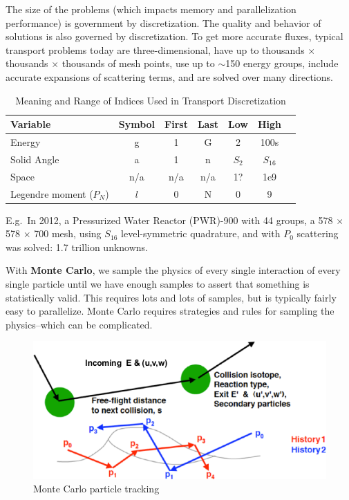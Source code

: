 \documentclass[12pt]{article}
\begin{document}
The size of the problems (which impacts memory and parallelization performance) is government by discretization. The quality and behavior of solutions is also governed by discretization. To get more accurate fluxes, typical transport problems today are three-dimensional, have up to thousands $\times$ thousands $\times$ thousands of mesh points, use up to $\sim$150 energy groups, include accurate expansions of scattering terms, and are solved over many directions. 
%
\begin{table}[!h]
\caption{Meaning and Range of Indices Used in Transport Discretization}
\begin{center}
\begin{tabular}{l c c c c c c}
\hline
Variable & Symbol & First & Last & Low & High \\[0.5ex]
\hline
Energy & g & 1 & G & 2 & 100s \\
Solid Angle & a & 1 & n & $S_2$ & $S_{16}$ \\
Space & n/a & n/a & n/a & 1? & 1e9 \\
Legendre moment ($P_{N}$) & $l$ & 0 & N & 0 & 9 \\
\hline
\end{tabular}
\end{center}
\label{table:index}
\end{table}

E.g.\ In 2012, a Pressurized Water Reactor (PWR)-900 with 44 groups, a 578 $\times$ 578 $\times$ 700 mesh, using $S_{16}$ level-symmetric quadrature, and with $P_{0}$ scattering was solved: 1.7 trillion unknowns.

With \textbf{Monte Carlo}, we sample the physics of every single interaction of every single particle until we have enough samples to assert that something is statistically valid. This requires lots and lots of samples, but is typically fairly easy to parallelize. Monte Carlo requires strategies and rules for sampling the physics--which can be complicated. 
\begin{figure}[h!]
    \begin{center}
    \includegraphics[keepaspectratio, width = 4 in]{MC}
    \end{center}
    \caption{Monte Carlo particle tracking}
    \label{fig:mc}
\end{figure}
\end{document}
